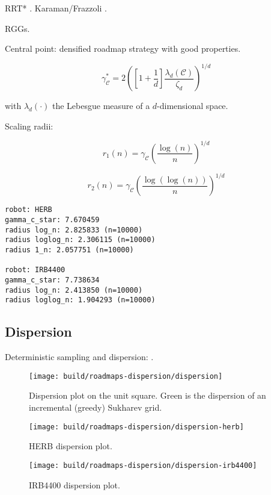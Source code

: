 RRT* \citep{karaman2010rrtstar}.
Karaman/Frazzoli \citep{karaman2011samplingoptimal}.

RGGs.

Central point: densified roadmap strategy with good properties.

\begin{equation}
   \gamma^*_{\mathcal{C}}
      = 2 \left( \left[ 1 + \frac{1}{d} \right]
         \frac{\lambda_d(\mathcal{C})}{\zeta_d} \right)^{1/d}
\end{equation}

with $\lambda_d(\cdot)$ the Lebesgue measure of a $d$-dimensional
space.

Scaling radii:

\begin{equation}
   r_1(n) = \gamma_{\mathcal{C}} \left( \frac{\log(n)}{n} \right)^{1/d}
\end{equation}

\begin{equation}
   r_2(n) = \gamma_{\mathcal{C}} \left( \frac{\log(\log(n))}{n} \right)^{1/d}
\end{equation}

\begin{verbatim}
robot: HERB
gamma_c_star: 7.670459
radius log_n: 2.825833 (n=10000)
radius loglog_n: 2.306115 (n=10000)
radius 1_n: 2.057751 (n=10000)

robot: IRB4400
gamma_c_star: 7.738634
radius log_n: 2.413850 (n=10000)
radius loglog_n: 1.904293 (n=10000)
\end{verbatim}

\subsection{Dispersion}

Deterministic sampling and dispersion:
\citep{janson2015deterministicsampling}.

\begin{figure}
   \centering
   \texttt{[image: build/roadmaps-dispersion/dispersion]}
   \caption{Dispersion plot on the unit square.
      Green is the dispersion of an incremental (greedy) Sukharev
      grid.}
\end{figure}

\begin{figure}
   \centering
   \texttt{[image: build/roadmaps-dispersion/dispersion-herb]}
   \caption{HERB dispersion plot.}
\end{figure}

\begin{figure}
   \centering
   \texttt{[image: build/roadmaps-dispersion/dispersion-irb4400]}
   \caption{IRB4400 dispersion plot.}
\end{figure}

